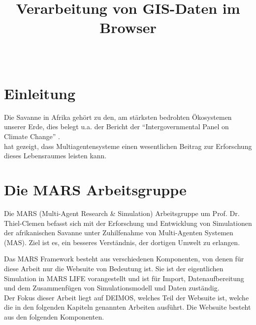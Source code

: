\documentclass[10pt,conference,compsocconf]{IEEEtran}
\begin{document}
	\title{\textbf{\Large Verarbeitung von GIS-Daten im Browser}\\[0.2ex]}
	
	\author{
		\\
	}
	
\maketitle

\IEEEpeerreviewmaketitle



\section{Einleitung}
Die Savanne in Afrika gehört zu den, am stärksten bedrohten Ökosystemen unserer Erde, dies belegt u.a. der Bericht der \enquote{Intergovernmental Panel on Climate Change} \cite{climateReport}.\\
\cite{LUDAS} hat gezeigt, dass Multiagentensysteme einen wesentlichen Beitrag zur Erforschung dieses Lebensraumes leisten kann.



\section{Die MARS Arbeitsgruppe}
Die MARS (Multi-Agent Research \& Simulation) Arbeitsgruppe um Prof. Dr. Thiel-Clemen befasst sich mit der Erforschung und Entwicklung von Simulationen der afrikanischen Savanne unter Zuhilfenahme von Multi-Agenten Systemen (MAS). Ziel ist es, ein besseres Verständnis, der dortigen Umwelt zu erlangen. \par
Das MARS Framework besteht aus verschiedenen Komponenten, von denen für diese Arbeit nur die Websuite von Bedeutung ist. Sie ist der eigentlichen Simulation in MARS LIFE vorangestellt und ist für Import, Datenaufbereitung und dem Zusammenfügen von Simulationsmodell und Daten zuständig. \\
\indent Der Fokus dieser Arbeit liegt auf DEIMOS, welches Teil der Websuite ist, welche die in den folgenden Kapiteln genannten Arbeiten ausführt. Die Websuite besteht aus den folgenden Komponenten.
\end{document}
